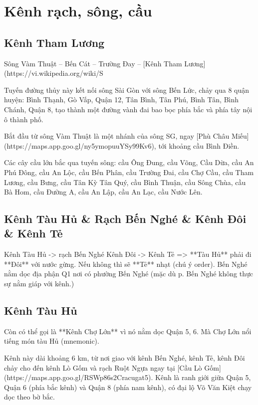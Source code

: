 \chapter{Kênh rạch, sông, cầu}

\section{Kênh Tham Lương}

Sông Vàm Thuật – Bến Cát – Trường Đay – [Kênh Tham Lương](https://vi.wikipedia.org/wiki/S%

Tuyến đường thủy này kết nối sông Sài Gòn với sông Bến Lức, chảy qua 8 quận huyện: Bình Thạnh, Gò Vấp, Quận 12, Tân Bình, Tân Phú, Bình Tân, Bình Chánh, Quận 8, tạo thành một đường vành đai bao bọc phía bắc và phía tây nội ô thành phố.

Bắt đầu từ sông Vàm Thuật là một nhánh của sông SG, ngay [Phù Châu Miếu](https://maps.app.goo.gl/ny5ymopuuYSy99Kv6), tới khoảng cầu Bình Điền.

Các cây cầu lớn bắc qua tuyến sông: cầu Ông Đung, cầu Võng, Cầu Dừa, cầu An Phú Đông, cầu An Lộc, cầu Bến Phân, cầu Trường Đai, cầu Chợ Cầu, cầu Tham Lương, cầu Bưng, cầu Tân Kỳ Tân Quý, cầu Bình Thuận, cầu Sông Chùa, cầu Bà Hom, cầu Đường A, cầu An Lập, cầu An Lạc, cầu Nước Lên.

\section{Kênh Tàu Hủ \& Rạch Bến Nghé \& Kênh Đôi \& Kênh Tẻ}

Kênh Tàu Hủ -> rạch Bến Nghé
Kênh Đôi -> Kênh Tẻ
=> **Tàu Hủ** phải đi **Đôi** với nước gừng. Nếu không thì sẽ **Tẻ** nhạt (chú ý order). Bến Nghé nằm dọc địa phận Q1 nơi có phường Bến Nghé (mặc dù p. Bến Nghé không thực sự nằm giáp với kênh.)

\section{Kênh Tàu Hủ}

Còn có thể gọi là **Kênh Chợ Lớn** vì nó nằm dọc Quận 5, 6. Mà Chợ Lớn nổi tiếng món tàu Hủ (mnemonic).

Kênh này dài khoảng 6 km, từ nơi giao với kênh Bến Nghé, kênh Tẻ, kênh Đôi chảy cho đến kênh Lò Gốm và rạch Ruột Ngựa ngay tại [Cầu Lò Gốm](https://maps.app.goo.gl/RSWp86s2Cracugat5). Kênh là ranh giới giữa Quận 5, Quận 6 (phía bắc kênh) và Quận 8 (phía nam kênh), có đại lộ Võ Văn Kiệt chạy dọc theo bờ bắc.

